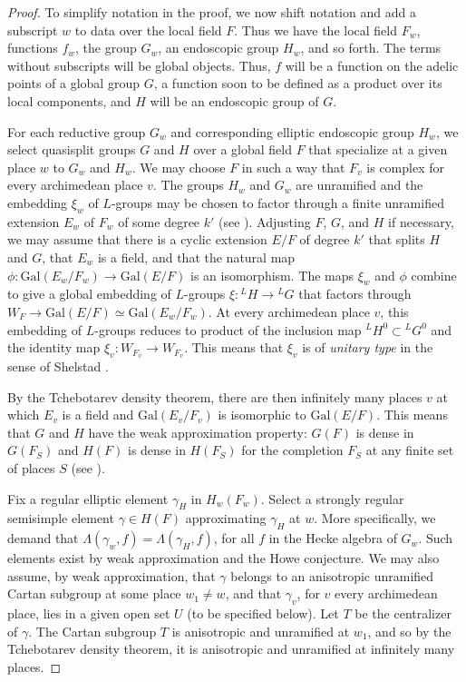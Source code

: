 \documentclass{amsart}
\newcommand\Gal{\text{Gal}}
\begin{document}
\begin{proof} 
To simplify notation in the proof, we now shift notation and add a subscript
$w$ to data over the local field $F$.  Thus we have the
local field $F_w$, functions $f_w$, the group $G_w$, an endoscopic
group $H_w$, and so forth.  The terms without subscripts
will be global objects.  Thus, $f$ will be a function on the
adelic points of a global group $G$, a function 
soon to be defined as a product over its
local components, and $H$ will be an endoscopic
group of $G$.

For each reductive group $G_w$ and corresponding elliptic
endoscopic group $H_w$, we
select quasisplit groups $G$ and $H$ over a global field
$F$ that specialize at a given
place $w$ to $G_w$ and $H_w$.  We may choose $F$ in
such a way that $F_v$ is complex for every archimedean place $v$.
The groups $H_w$ and $G_w$ are unramified and the embedding $\xi_w$ of
$L$-groups may be chosen to factor
through a finite unramified extension
$E_w$ of $F_w$ of some degree $k'$  (see \cite{H2}).  Adjusting
$F$, $G$, and $H$ if necessary, we may assume that there is a 
cyclic extension $E/F$ of degree $k'$ that splits $H$ and $G$,
that $E_w$ is a field, and that
the natural map $\phi:\Gal(E_w/F_w)\to \Gal(E/F)$ is an
isomorphism.  The maps $\xi_w$ and $\phi$ combine to give
a global embedding of $L$-groups $\xi:{}^LH\to{}^LG$ that
factors through $W_F\to \Gal(E/F)\simeq \Gal(E_w/F_w)$.  
At every archimedean place $v$,
this embedding of $L$-groups reduces to product of the inclusion
map ${}^LH^0\subset {}^LG^0$ and the identity map $\xi_v:W_{F_v}\to W_{F_v}$.
This means that $\xi_v$ is of {\it unitary type\/} in the sense
of Shelstad \cite{Sh3}.

By the Tchebotarev density theorem, there are then infinitely many places
$v$ at which $E_v$ is a field and $\Gal(E_v/F_v)$ is isomorphic
to $\Gal(E/F)$.  This means that $G$ and $H$ have the weak approximation
property:  $G(F)$ is dense in $G(F_S)$ and $H(F)$ is dense in $H(F_S)$
for the completion $F_S$ at any finite set of places $S$ (see
\cite{KR}).


Fix a regular elliptic element $\gamma_H$ in $H_w(F_w)$.
Select a strongly regular semisimple element
$\gamma\in H(F)$ approximating $\gamma_H$ at $w$.  More specifically,
we demand that $\Lambda(\gamma_w,f) = \Lambda(\gamma_H,f)$,
for all $f$ in the Hecke algebra of $G_w$.
Such elements exist by weak approximation
and the Howe conjecture.  We may also assume, by weak approximation,
that $\gamma$ belongs to an anisotropic unramified Cartan subgroup
at some place $w_1\ne w$, and that $\gamma_v$, for $v$ every archimedean
place, lies in a given open set $U$ (to be specified below).
Let $T$ be the centralizer of $\gamma$.  The Cartan subgroup $T$
is anisotropic and unramified at $w_1$, and so by the Tchebotarev
density theorem, it is anisotropic and unramified at infinitely
many places.


\end{proof}
\end{document}

